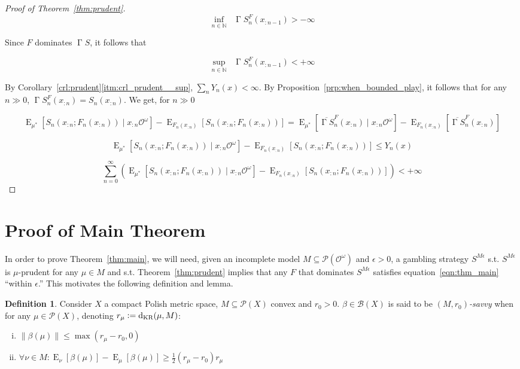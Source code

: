\documentclass[11pt]{article}
\theoremstyle{definition}
\newtheorem{definition}{Definition}%
\theoremstyle{plain}
\newcommand{\Nats}{\mathbb{N}}
\newcommand{\N}[1]{\lVert #1 \rVert}
\DeclareMathOperator{\E}{E}
\newcommand{\PM}{\mathcal{P}}
\newcommand{\DKR}{\operatorname{d}_{\textnormal{KR}}}
\newcommand{\Ob}{\mathcal{O}}
\newcommand{\OO}{\Ob^\omega}
\newcommand{\PMO}{\PM(\OO)}
\newcommand{\Gm}{\mathcal{B}}
\DeclareMathOperator{\SVM}{\Sigma V_{\min}}
\DeclareMathOperator{\SVX}{\Sigma V_{\max}}
\DeclareMathOperator{\PG}{\Gamma}
\begin{document}
\begin{proof}[Proof of Theorem~\ref{thm:prudent}]
\[\inf_{n \in \Nats} \SVM \PG{S}^F_{n}(x_{:n-1}) > -\infty\]

Since $F$ dominates $\PG{S}$, it follows that

\[\sup_{n \in \Nats} \SVX \PG{S}^F_{n}(x_{:n-1}) < +\infty\] 

By Corollary~\ref*{crl:prudent}\ref{itm:crl_prudent__sup}, $\sum_n Y_n(x) < \infty$. By Proposition~\ref{prp:when_bounded_play}, it follows that for any $n \gg 0$, $\PG{S}^F_n(x_{:n}) = S_n(x_{:n})$. We get, for $n \gg 0$

$$\E_{\mu^*}[S_n(x_{:n};F_n(x_{:n})) \mid x_{:n}\OO]-\E_{F_n(x_{:n})}[S_n(x_{:n};F_n(x_{:n}))] = \E_{\mu^*}[\overline{\PG{S}}^F_n(x_{:n}) \mid x_{:n}\OO]-\E_{F_n(x_{:n})}[\overline{\PG{S}}^F_n(x_{:n})]$$

$$\E_{\mu^*}[S_n(x_{:n};F_n(x_{:n})) \mid x_{:n}\OO]-\E_{F_n(x_{:n})}[S_n(x_{:n};F_n(x_{:n}))] \leq Y_n(x)$$

$$\sum_{n=0}^\infty (\E_{\mu^*}[S_n(x_{:n};F_n(x_{:n})) \mid x_{:n}\OO]-\E_{F_n(x_{:n})}[S_n(x_{:n};F_n(x_{:n}))]) < +\infty$$
\end{proof}

\section{Proof of Main Theorem}
\label{sec:construction}

In order to prove Theorem~\ref{thm:main}, we will need, given an incomplete model $M \subseteq \PMO$ and $\epsilon > 0$, a gambling strategy $S^{M\epsilon}$ s.t. $S^{M\epsilon}$ is $\mu$-prudent for any $\mu \in M$ and s.t. Theorem~\ref{thm:prudent} implies that any $F$ that dominates $S^{M\epsilon}$ satisfies equation~\ref{eqn:thm_main} \enquote{within $\epsilon$.} This motivates the following definition and lemma.

\begin{samepage}
\begin{definition}

Consider $X$ a compact Polish metric space, $M \subseteq \PM(X)$ convex and $r_0 > 0$. $\beta \in \Gm(X)$ is said to be \emph{$(M,r_0)$-savvy} when for any $\mu \in \PM(X)$, denoting $r_\mu:=\DKR(\mu,M)$:

\begin{enumerate}[i.]

\item $\N{\beta(\mu)} \leq \max(r_\mu - r_0,0)$
\item $\forall \nu \in M: \E_\nu[\beta(\mu)] - \E_\mu[\beta(\mu)] \geq \frac{1}{2}(r_\mu - r_0) r_\mu$

\end{enumerate}

\end{definition}
\end{samepage}
\end{document}
